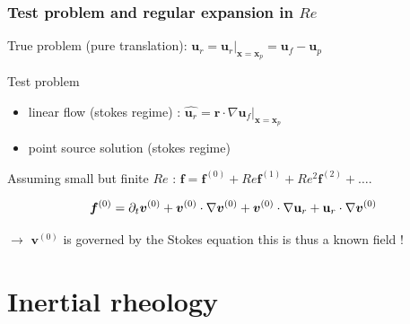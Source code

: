 \documentclass{sintefbeamer}
\begin{document}
\begin{frame}
  \frametitle{Test problem and regular expansion in $Re$}

  True problem (pure translation): $\textbf{u}_r  = \textbf{u}_r|_{\bm x = \bm x_p} = \textbf{u}_f-\textbf{u}_p$
  \vspace{0.5cm}

  Test problem 
  \begin{itemize}
    \item linear flow (stokes regime) : $\hat{\textbf{u}_r} =  \textbf{r} \cdot \nabla \hat{\textbf{u}}_f |_{\bm x = \bm x_p}$
    \item point source solution (stokes regime)
  \end{itemize}
  \vspace{0.5cm}

  Assuming small but finite $Re$ : $\bm f = \bm f^{(0)} + Re  \bm f^{(1)} + Re^2  \bm f^{(2)} + \ldots$. 

  
  \begin{equation*}
    \bm f^{(0)}
    =
        \partial_t \bm v^{(0)}
        + \bm v^{(0)}\cdot \mathbf{\nabla}\bm v^{(0)} 
        +  \bm v^{(0)}\cdot \mathbf{\nabla}\textbf{u}_r 
        +  \textbf{u}_r\cdot \mathbf{\nabla}\bm v^{(0)}
  \end{equation*}

  $\to$ $\bm v^{(0)}$ is governed by the Stokes equation this is thus a known field ! 
\end{frame}

\section{Inertial rheology}
\section*{}
\end{document}
